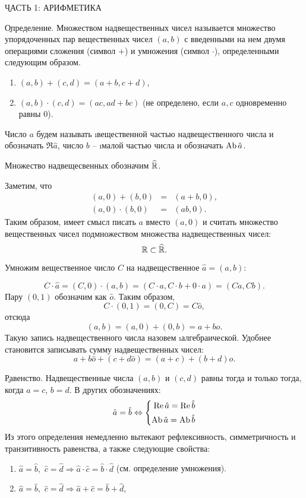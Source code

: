 \begin{center}
	\b{ЧАСТЬ 1: АРИФМЕТИКА}
\end{center}

\b{Определение.} Множеством надвещественных чисел называется множество упорядоченных пар вещественных чисел $(a, b)$ с введенными на нем двумя операциями сложения (символ $+$) и умножения (символ $\cdot$), определенными следующим образом.
	\begin{enumerate}
		\item $(a, b)+(c, d)=(a+b, c+d)$, 
		\item $(a, b)\cdot(c, d)=(ac, ad+bc)$ (не определено, если $a, c$ одновременно равны $0$).
	\end{enumerate}
Число $a$ будем называть \i{вещественной} частью надвещественного числа и обозначать $\Re{\hat a}$, число $b$ -- \i{малой} частью числа и обозначать $\operatorname{Ab} \hat a$.\par
Множество надвещесвенных обозначим $\widehat{\mathbb{R}}$. \par
Заметим, что
	\begin{eqnarray}
		(a, 0)+(b, 0) &=&(a+b, 0), \\
		(a, 0)\cdot(b, 0)&=&(ab, 0).
	\end{eqnarray}
Таким образом, имеет смысл писать $a$ вместо $(a, 0)$ и считать множество вещественных чисел подмножеством множества надвещественных чисел:
	$$\mathbb{R}\subset \widehat{\mathbb{R}}.$$
\begin{example} 
	Умножим вещественное число $C$ на надвещественное $\hat{a}=(a, b)$:
\end{example}
	$$C\cdot\hat{a}=(C, 0)\cdot(a, b)=(C\cdot a, C\cdot b+0\cdot a)=(Ca, Cb).$$
Пару $(0, 1)$ обозначим как $\hat{o}$. Таким образом,
	$$C\cdot(0, 1)=(0, C)=C\hat{o},$$
отсюда 
	\begin{equation}
		(a, b)=(a, 0)+(0, b)=a+b\hat{o}.
	\end{equation}
Такую запись надвещественного числа назовем \i{алгебраической}. Удобнее становится записывать сумму надвещественных чисел:
	\begin{equation}
		a+b\hat{o}+(c+d\hat{o})=(a+c)+(b+d)\hat{o}.
	\end{equation}

\b{Равенство.} Надвещественные числа $(a, b)$ и $(c, d)$ равны тогда и только тогда, когда $a=c$, $b=d$. В других обозначениях:
	\begin{equation}
	  \hat{a}=\hat{b}\Leftrightarrow
		\left\{
			\begin{aligned}
				\operatorname{Re} \hat a=\operatorname{Re} \hat b \\
				\operatorname{Ab} \hat a=\operatorname{Ab} \hat b
			\end{aligned}
		\right.
	\end{equation}
Из этого определения немедленно вытекают рефлексивность, симметричность и транзитивность равенства, а также следующие свойства:
\begin{enumerate}
	\item $\hat{a}=\hat{b},\,\,\hat{c}=\hat{d}\Rightarrow \hat{a}\cdot\hat{c}=\hat{b}\cdot\hat{d}$ (см. определение умножения).
	\item $\hat{a}=\hat{b},\,\,\hat{c}=\hat{d}\Rightarrow \hat{a}+\hat{c}=\hat{b}+\hat{d}$,
\end{enumerate}

